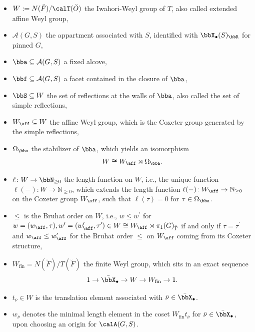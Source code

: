 \documentclass[10pt, reqno]{amsart}
\theoremstyle{plain}
\theoremstyle{definition}
\numberwithin{equation}{section}
\begin{document}
	\begin{itemize}
		\item $W:=N(\breve{F})/\calT(\breve{O})$ the Iwahori-Weyl group of $T$, also called extended affine Weyl group,
		\item $\mathcal{A}(G,S)$ the appartment associated with $S$, identified with $\bbX_\bullet(S)_{\bbR}$ for pinned $G$,
		\item $\bba\subseteq \mathcal{A}(G,S)$ a fixed alcove,
		\item $\bbf \subseteq \mathcal{A}(G,S)$ a facet contained in the closure of $\bba$,
		\item $\bbS\subseteq W$ the set of reflections at the walls of $\bba$, also called the set of simple reflections,
		\item $W_\aff\subseteq W$ the affine Weyl group, which is the Coxeter group generated by the simple reflections,
		\item $\Omega_{\bba}$ the stabilizer of $\bba$, which yields an isomorphism
		\begin{equation}
			W\cong W_\aff\rtimes \Omega_{\bba}.
		\end{equation}
		\item $\ell\colon W\to \bbN_{\geq 0}$ the length function on $W$, i.e., the unique function $\ell(-)\colon W\to \mathbb{N}_{\geq 0}$, which extends the length function $\ell(-)\colon W_\aff\to \mathbb{N}_{\geq 0}$ on the Coxeter group $W_\aff$, such that $\ell(\tau)=0$ for $\tau\in \Omega_{\bba}$.
		\item $\leq$ is the Bruhat order on $W$, i.e., $w\leq w^\prime$ for $w=(w_\aff,\tau), w^\prime=(w^\prime_\aff,\tau^\prime)\in W\cong W_\aff\rtimes \pi_1(G)_{\breve{\Gamma}}$ if and only if $\tau=\tau^\prime$ and $w_\aff\leq w^\prime_\aff$ for the Bruhat order $\leq$ on $W_\aff$ coming from its Coxeter structure,
		\item $W_{\mathrm{fin}}=N(\breve{F})/T(\breve{F})$ the finite Weyl group, which sits in an exact sequence
		\begin{equation}
			1\to \bar{\bbX}_\bullet\to W\to W_{\mathrm{fin}}\to 1.
		\end{equation}
		\item $t_{\bar{\nu}}\in W$ is the translation element associated with $\bar{\nu}\in \bar{\bbX}_\bullet$. 
		\item $w_{\bar{\nu}}$ denotes the minimal length element in the coset $W_\mathrm{fin}t_{\bar{\nu}}$ for $\bar{\nu}\in\bar{\bbX}_\bullet$, upon choosing an origin for $\calA(G,S)$.
	\end{itemize}
	
\end{document}

